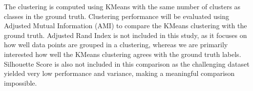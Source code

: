

The clustering is computed using KMeans with the same number of clusters as classes in the ground truth. 
Clustering performance will be evaluated using Adjusted Mutual Information (AMI) \cite{romano_standardized_2014} to compare the KMeans clustering with the ground truth.
Adjusted Rand Index is not included in this study, as it focuses on how well data points are grouped in a clustering, whereas we are primarily interested how well the KMeans clustering agrees with the ground truth labels.
Silhouette Score is also not included in this comparison as the challenging dataset yielded very low performance and variance, making a meaningful comparison impossible.

